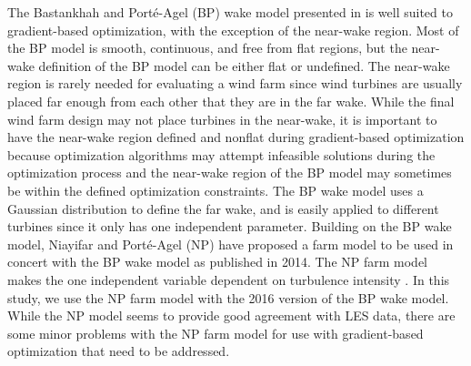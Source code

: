 \documentclass[conf]{new-aiaa}
\begin{document}
The Bastankhah and Port\'{e}-Agel (BP) wake model presented in \cite{bastankhah2014, bastankhah2016} is well suited to gradient-based optimization, with the exception of the near-wake region. Most of the BP model is smooth, continuous, and free from flat regions, but the near-wake definition of the BP model can be either flat or undefined. The near-wake region is rarely needed for evaluating a wind farm since wind turbines are usually placed far enough from each other that they are in the far wake. While the final wind farm design may not place turbines in the near-wake, it is important to have the near-wake region defined and nonflat during gradient-based optimization because optimization algorithms may attempt infeasible solutions during the optimization process \cite{belegundu2011} and the near-wake region of the BP model may sometimes be within the defined optimization constraints. The BP wake model uses a Gaussian distribution to define the far wake, and is easily applied to different turbines since it only has one independent parameter. Building on the BP wake model, Niayifar and Port\'{e}-Agel (NP) have proposed a farm model \cite{niayifar2015, niayifar2016} to be used in concert with the BP wake model as published in 2014. The NP farm model makes the one independent variable dependent on turbulence intensity \cite{bastankhah2014}.  In this study, we use the NP farm model with the 2016 version of the BP wake model. While the NP model seems to provide good agreement with LES data, there are some minor problems with the NP farm model for use with gradient-based optimization that need to be addressed.


%
\end{document}
